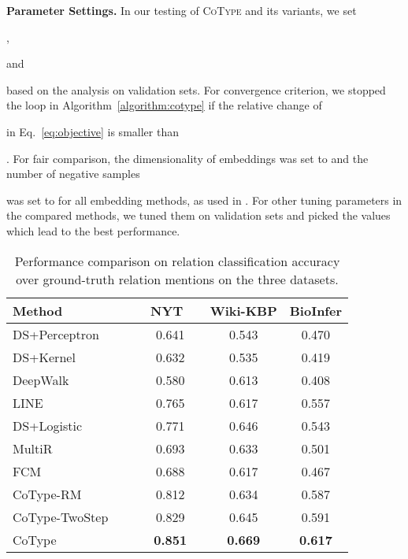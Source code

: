 \documentclass[letterpaper]{sig-alternate-2013}
\begin{document}
\smallskip
\noindent
\textsf{\small \textbf{Parameter Settings.}}
In our testing of \textsc{CoType} and its variants, we set \begin{small}\end{small}, \begin{small}\end{small} and \begin{small}\end{small} based on the analysis on validation sets. For convergence criterion, we stopped the loop in Algorithm~\ref{algorithm:cotype} if the relative change of \begin{small}\end{small} in Eq.~\eqref{eq:objective} is smaller than \begin{small}\end{small}.
For fair comparison, the dimensionality of embeddings  was set to  and the number of negative samples \begin{small}\end{small} was set to  for all embedding methods, as used in \cite{tang2015line}. For other tuning parameters in the compared methods, we tuned them on validation sets and picked the values which lead to the best performance.


\begin{table}[t]
\vspace{-0.3cm}
\begin{scriptsize}
\begin{center}
\begin{tabularx}{0.8\linewidth}{l | ccc}
\hline
\textbf{Method} & \textbf{~NYT~~} & \textbf{Wiki-KBP} & \textbf{BioInfer} \\
\hline
DS+Perceptron~\cite{ling2012fine}~~~~ & 0.641 & 0.543 & 0.470 \\ DS+Kernel~\cite{mooney2005subsequence} & 0.632 & 0.535 & 0.419 \\ DeepWalk~\cite{perozzi2014deepwalk} & 0.580 & 0.613 & 0.408 \\ LINE~\cite{tang2015line} & 0.765 & 0.617 & 0.557 \\ DS+Logistic~\cite{mintz2009distant} & 0.771 & 0.646 & 0.543 \\ MultiR~\cite{hoffmann2011multiR} & 0.693 & 0.633 & 0.501 \\
FCM~\cite{gormley2015improved} & 0.688 & 0.617 & 0.467 \\ \hline
CoType-RM & 0.812 & 0.634 & 0.587 \\
CoType-TwoStep & 0.829 & 0.645 & 0.591 \\
CoType & \textbf{0.851} & \textbf{0.669} & \textbf{0.617} \\
\hline
\end{tabularx}
\caption{Performance comparison on relation classification accuracy over ground-truth relation mentions on the three datasets.}
\label{table:relation_classification}
\vspace{-0.4cm}
\end{center}
\end{scriptsize}
\end{table}
\end{document}
